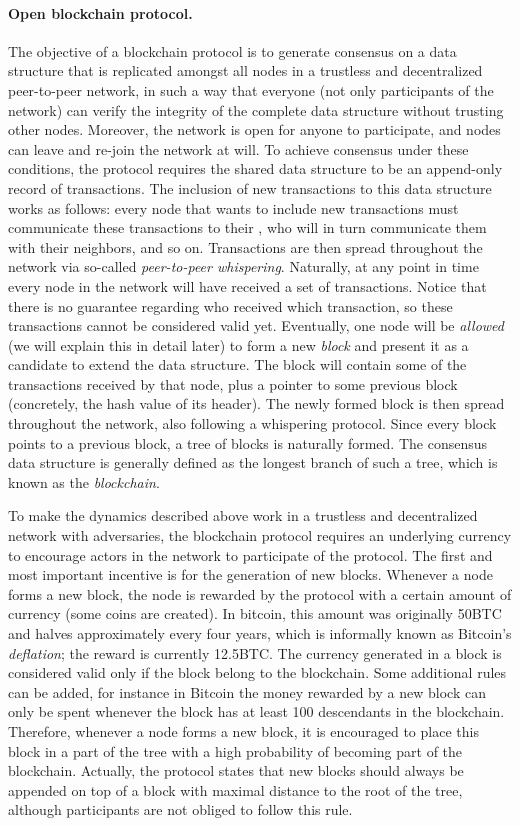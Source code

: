 \paragraph{\bf Open blockchain protocol.} The objective of a blockchain protocol is to generate consensus on a data structure that is replicated amongst all nodes in a trustless 
and decentralized peer-to-peer network, in such a way that everyone (not only participants of the network) can verify the integrity of the complete data structure without trusting other nodes. Moreover, the network is open for anyone to participate, and nodes can leave and re-join the network at will. To achieve consensus under these conditions, the protocol requires the shared data structure to be an append-only record of transactions. The inclusion of new transactions to this data structure works as follows: every node that wants to include new transactions must communicate these transactions to their , who will in turn communicate them with their neighbors, and so on. Transactions are then spread throughout the network via so-called \emph{peer-to-peer whispering}. Naturally, at any point in time every node in the network will have received a set of transactions. Notice that there is no guarantee regarding who received which transaction, so these transactions cannot be considered valid yet. Eventually, one node will be \emph{allowed} (we will explain this in detail later) to form a new \emph{block} and present it as a candidate to extend the data structure. The block will contain some of the transactions received by that node, plus a pointer to some previous block (concretely, the hash value of its header). The newly formed block is then spread throughout the network, also following a whispering protocol. Since every block points to a previous block, a tree of blocks is naturally formed. The consensus data structure is generally defined as the longest branch of such a tree, which is known as the \emph{blockchain}.

To make the dynamics described above work in a trustless and decentralized network with adversaries, the blockchain protocol requires an underlying currency to encourage actors in the network to participate of the protocol. The first and most important incentive is for the generation of new blocks. Whenever a node forms a new block, the node is rewarded by the protocol with a certain amount of currency (some coins are created). In bitcoin, this amount was originally 50BTC and halves  approximately every four years, which is informally known as Bitcoin's \emph{deflation}; the reward is currently 12.5BTC. The currency generated in a block is considered valid  only if the block belong to the blockchain. Some additional rules can be added, for instance in Bitcoin the money rewarded by a new block can only be spent whenever the block has at least 100 descendants in the blockchain. Therefore, whenever a node forms a new block, it is encouraged to place this block in a part of the tree with a high probability of becoming part of the blockchain. Actually, the protocol states that new blocks should always be appended on top of a block with maximal distance to the root of the tree, although participants are not obliged to follow this rule.


